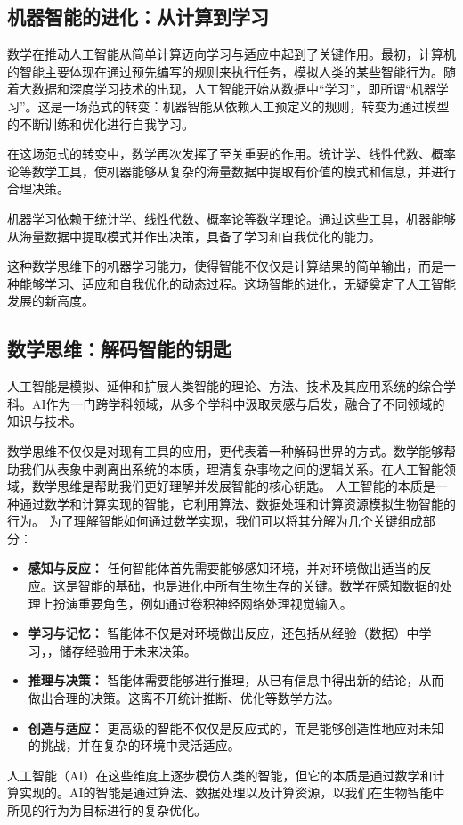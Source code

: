 \subsection*{机器智能的进化：从计算到学习}

数学在推动人工智能从简单计算迈向学习与适应中起到了关键作用。最初，计算机的智能主要体现在通过预先编写的规则来执行任务，模拟人类的某些智能行为。随着大数据和深度学习技术的出现，人工智能开始从数据中“学习”，即所谓“机器学习”。这是一场范式的转变：机器智能从依赖人工预定义的规则，转变为通过模型的不断训练和优化进行自我学习。

在这场范式的转变中，数学再次发挥了至关重要的作用。统计学、线性代数、概率论等数学工具，使机器能够从复杂的海量数据中提取有价值的模式和信息，并进行合理决策。

机器学习依赖于统计学、线性代数、概率论等数学理论。通过这些工具，机器能够从海量数据中提取模式并作出决策，具备了学习和自我优化的能力。

这种数学思维下的机器学习能力，使得智能不仅仅是计算结果的简单输出，而是一种能够学习、适应和自我优化的动态过程。这场智能的进化，无疑奠定了人工智能发展的新高度。

\subsection*{数学思维：解码智能的钥匙}

人工智能是模拟、延伸和扩展人类智能的理论、方法、技术及其应用系统的综合学科。AI作为一门跨学科领域，从多个学科中汲取灵感与启发，融合了不同领域的知识与技术。

数学思维不仅仅是对现有工具的应用，更代表着一种解码世界的方式。数学能够帮助我们从表象中剥离出系统的本质，理清复杂事物之间的逻辑关系。在人工智能领域，数学思维是帮助我们更好理解并发展智能的核心钥匙。
人工智能的本质是一种通过数学和计算实现的智能，它利用算法、数据处理和计算资源模拟生物智能的行为。
为了理解智能如何通过数学实现，我们可以将其分解为几个关键组成部分：
\begin{itemize}
\item {\bf 感知与反应：} 任何智能体首先需要能够感知环境，并对环境做出适当的反应。这是智能的基础，也是进化中所有生物生存的关键。数学在感知数据的处理上扮演重要角色，例如通过卷积神经网络处理视觉输入。

\item  {\bf 学习与记忆：} 智能体不仅是对环境做出反应，还包括从经验（数据）中学习，，储存经验用于未来决策。

\item  {\bf 推理与决策：} 智能体需要能够进行推理，从已有信息中得出新的结论，从而做出合理的决策。这离不开统计推断、优化等数学方法。

\item  {\bf 创造与适应：} 更高级的智能不仅仅是反应式的，而是能够创造性地应对未知的挑战，并在复杂的环境中灵活适应。
\end{itemize}
人工智能（AI）在这些维度上逐步模仿人类的智能，但它的本质是通过数学和计算实现的。AI的智能是通过算法、数据处理以及计算资源，以我们在生物智能中所见的行为为目标进行的复杂优化。

